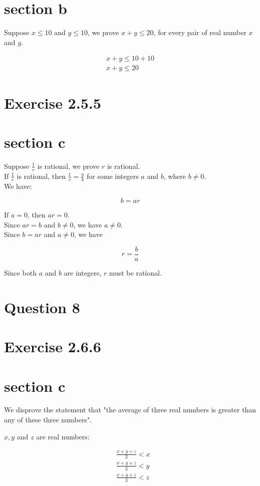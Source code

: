 \documentclass[10pt]{article}
\begin{document}
\section*{section b}
Suppose $x \leq 10$ and $y \leq 10$, we prove $x+y \leq 20$, for every pair of real number $x$ and $y$.

$$
\begin{array}{r}
x+y \leq 10+10 \\
x+y \leq 20
\end{array}
$$

\section*{Exercise 2.5.5}
\section*{section c}
Suppose $\frac{1}{r}$ is rational, we prove $r$ is rational.\\
If $\frac{1}{r}$ is rational, then $\frac{1}{r}=\frac{a}{b}$ for some integers $a$ and $b$, where $b \neq 0$.\\
We have:

$$
b=a r
$$

If $a=0$, then $a r=0$. \\
Since $a r=b$ and $b \neq 0$, we have $a \neq 0$.\\
Since $b=a r$ and $a \neq 0$, we have

$$
r=\frac{b}{a}
$$

Since both $a$ and $b$ are integers, $r$ must be rational.

\pagebreak
\section*{Question 8}
\section*{Exercise 2.6.6}
\section*{section c}
We disprove the statement that "the average of three real numbers is greater than any of these three numbers".

$x, y$ and $z$ are real numbers:

$$
\begin{aligned}
& \frac{x+y+z}{3}<x \\
& \frac{x+y+z}{3}<y \\
& \frac{x+y+z}{3}<z
\end{aligned}
$$
\end{document}
